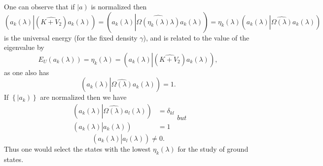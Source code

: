 \documentclass[aps,preprint]{revtex4}%
\begin{document}
One can observe that if $\left\vert a\right)  $ is normalized then
\begin{equation}
\left(  a_{k}\left(  \lambda\right)  \left\vert \left(  \widehat{K+V_{2}%
}\right)  \right.  a_{k}\left(  \lambda\right)  \right)  =\left(  a_{k}\left(
\lambda\right)  \left\vert \widehat{\Omega\left(  \eta_{k}\left(
\lambda\right)  \lambda\right)  }\right.  a_{k}\left(  \lambda\right)
\right)  =\eta_{k}\left(  \lambda\right)  \left(  a_{k}\left(  \lambda\right)
\left\vert \widehat{\Omega\left(  \lambda\right)  }\right.  a_{k}\left(
\lambda\right)  \right)
\end{equation}
is the universal energy (for the fixed density $\gamma$), and is related to
the value of the eigenvalue by
\begin{equation}
E_{U}\left(  a_{k}\left(  \lambda\right)  \right)  =\eta_{k}\left(
\lambda\right)  =\left(  a_{k}\left(  \lambda\right)  \left\vert \left(
\widehat{K+V_{2}}\right)  \right.  a_{k}\left(  \lambda\right)  \right)  ,
\end{equation}
as one also has
\begin{equation}
\left(  a_{k}\left(  \lambda\right)  \left\vert \widehat{\Omega\left(
\lambda\right)  }\right.  a_{k}\left(  \lambda\right)  \right)  =1.
\end{equation}
If $\left\{  \left\vert \overset{}{a_{k}}\right)  \right\}  $ are normalized
then we have
\begin{subequations}
\begin{align}
\left(  a_{k}\left(  \lambda\right)  \left\vert \widehat{\Omega\left(
\lambda\right)  }\right.  a_{l}\left(  \lambda\right)  \right)   &
=\delta_{kl}\\
\left(  a_{k}\left(  \lambda\right)  \left\vert \overset{}{a_{k}\left(
\lambda\right)  }\right.  \right)   &  =1
\end{align}
but
\end{subequations}
\begin{equation}
\left(  a_{k}\left(  \lambda\right)  \left\vert \overset{}{a_{l}\left(
\lambda\right)  }\right.  \right)  \neq0.
\end{equation}
Thus one would select the states with the lowest $\eta_{k}\left(
\lambda\right)  $ for the study of ground states.
\end{document}
